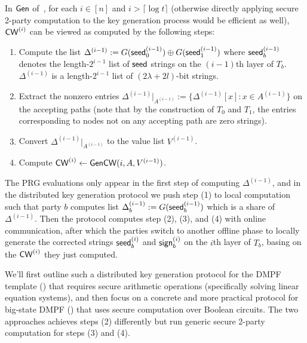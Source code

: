 In ${\sf Gen}$ of~, for each $i\in[n]$ and $i>\lceil\log t\rceil$ (otherwise directly applying secure 2-party computation to the key generation process would be efficient as well), ${\sf CW}^{(i)}$ can be viewed as computed by the following steps: 
\begin{enumerate}
    \item Compute the list $\Delta^{(i-1)}:=G({\sf seed}_0^{(i-1)})\oplus G({\sf seed}_1^{(i-1)})$ where ${\sf seed}_b^{(i-1)}$ denotes the length-$2^{i-1}$ list of ${\sf seed}$ strings on the $(i-1)$th layer of $T_b$. $\Delta^{(i-1)}$ is a length-$2^{i-1}$ list of $(2\lambda+2l)$-bit strings.
    \item Extract the nonzero entries $\Delta^{(i-1)}|_{A^{(i-1)}}:=\{\Delta^{(i-1)}[x]:x\in A^{(i-1)}\}$ on the accepting paths (note that by the construction of $T_0$ and $T_1$, the entries corresponding to nodes not on any accepting path are zero strings).
    \item Convert $\Delta^{(i-1)}|_{A^{(i-1)}}$ to the value list $V^{(i-1)}$.
    \item Compute ${\sf CW}^{(i)}\gets {\sf Gen}{\sf CW}(i,A,V^{(i-1)})$.
\end{enumerate}
The PRG evaluations only appear in the first step of computing $\Delta^{(i-1)}$, and in the distributed key generation protocol we push step (1) to local computation such that party $b$ computes list $\Delta_b^{(i-1)}:=G({\sf seed}_b^{(i-1)})$ which is a share of $\Delta^{(i-1)}$. 
Then the protocol computes step (2), (3), and (4) with online communication, after which the parties switch to another offline phase to locally generate the corrected strings ${\sf seed}_b^{(i)}$ and ${\sf sign}_b^{(i)}$ on the $i$th layer of $T_b$, basing on the ${\sf CW}^{(i)}$ they just computed. 

We'll first outline such a distributed key generation protocol for the DMPF template () that requires secure arithmetic operations (specifically solving linear equation systems), and then focus on a concrete and more practical protocol for big-state DMPF () that uses secure computation over Boolean circuits. The two approaches achieves steps (2) differently but run generic secure 2-party computation for steps (3) and (4). 

